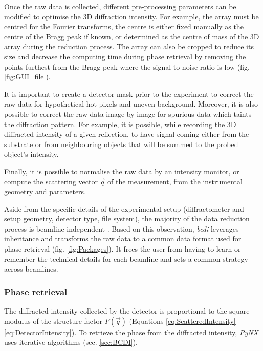Once the raw data is collected, different pre-processing parameters can be modified to optimise the 3D diffraction intensity.
For example, the array must be centred for the Fourier transforms, the centre is either fixed manually as the centre of the Bragg peak if known, or determined as the centre of mass of the 3D array during the reduction process.
The array can also be cropped to reduce its size and decrease the computing time during phase retrieval by removing the points furthest from the Bragg peak where the signal-to-noise ratio is low (fig. \ref{fig:GUI_file}).

It is important to create a detector mask prior to the experiment to correct the raw data for hypothetical hot-pixels and uneven background.
Moreover, it is also possible to correct the raw data image by image for spurious data which taints the diffraction pattern.
For example, it is possible, while recording the 3D diffracted intensity of a given reflection, to have signal coming either from the substrate or from neighbouring objects that will be summed to the probed object's intensity.

Finally, it is possible to normalise the raw data by an intensity monitor, or compute the scattering vector $\vec{q}$ of the measurement, from the instrumental geometry and parameters.

Aside from the specific details of the experimental setup (diffractometer and setup geometry, detector type, file system), the majority of the data reduction process is beamline-independent \parencite{Yang2019a}.
Based on this observation, \textit{bcdi} leverages inheritance and transforms the raw data to a common data format used for phase-retrieval (fig. \ref{fig:Packages}).
It frees the user from having to learn or remember the technical details for each beamline and sets a common strategy across beamlines.

\subsubsection{Phase retrieval} \label{sec:phaseretrievalpynx}

The diffracted intensity collected by the detector is proportional to the square modulus of the structure factor $F(\vec{q})$ (Equations \ref{eq:ScatteredIntensity}-\ref{eq:DetectorIntensity}).
To retrieve the phase from the diffracted intensity, \textit{PyNX} uses iterative algorithms (sec. \ref{sec:BCDI}).


